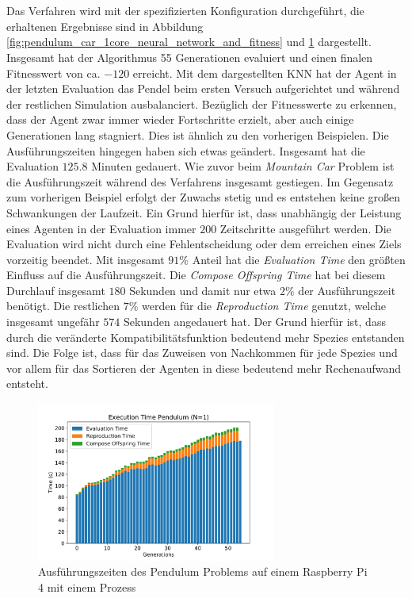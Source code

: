\\\\
Das Verfahren wird mit der spezifizierten Konfiguration durchgeführt, die erhaltenen Ergebnisse sind in Abbildung \ref{fig:pendulum_car_1core_neural_network_and_fitness} und \ref{fig:pendulum_1core_1pi_time} dargestellt. Insgesamt hat der Algorithmus 55 Generationen evaluiert und einen finalen Fitnesswert von ca. $-120$ erreicht. Mit dem dargestellten \ac{KNN} hat der Agent in der letzten Evaluation das Pendel beim ersten Versuch aufgerichtet und während der restlichen Simulation ausbalanciert. Bezüglich der Fitnesswerte zu erkennen, dass der Agent zwar immer wieder Fortschritte erzielt, aber auch einige Generationen lang stagniert. Dies ist ähnlich zu den vorherigen Beispielen. Die Ausführungszeiten hingegen haben sich etwas geändert. Insgesamt hat die Evaluation $125.8$ Minuten gedauert. Wie zuvor beim \emph{Mountain Car} Problem ist die Ausführungszeit während des Verfahrens insgesamt gestiegen. Im Gegensatz zum vorherigen Beispiel erfolgt der Zuwachs stetig und es entstehen keine großen Schwankungen der Laufzeit. Ein Grund hierfür ist, dass unabhängig der Leistung eines Agenten in der Evaluation immer $200$ Zeitschritte ausgeführt werden. Die Evaluation wird nicht durch eine Fehlentscheidung oder dem erreichen eines Ziels vorzeitig beendet. Mit insgesamt $91\%$ Anteil hat die \emph{Evaluation Time} den größten Einfluss auf die Ausführungszeit. Die \emph{Compose Offspring Time} hat bei diesem Durchlauf insgesamt $180$ Sekunden und damit nur etwa $2\%$ der Ausführungszeit benötigt. Die restlichen $7\%$ werden für die \emph{Reproduction Time} genutzt, welche insgesamt ungefähr $574$ Sekunden angedauert hat. Der Grund hierfür ist, dass durch die veränderte Kompatibilitätsfunktion bedeutend mehr Spezies entstanden sind. Die Folge ist, dass für das Zuweisen von Nachkommen für jede Spezies und vor allem für das Sortieren der Agenten in diese bedeutend mehr Rechenaufwand entsteht. 

\begin{figure}[!h]
	\centering
	\includegraphics[width=0.7\textwidth]{./img/pendulum_single_core/pendulum_1_1core_1pi_time.pdf} 
	\caption{Ausführungszeiten des Pendulum Problems auf einem Raspberry Pi 4 mit einem Prozess}
	\label{fig:pendulum_1core_1pi_time}
\end{figure}


